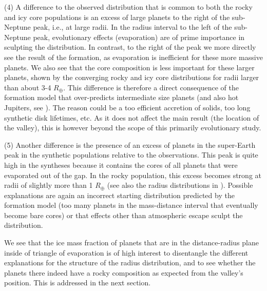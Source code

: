 \documentclass[]{emulateapj}
\def\rearth{R_{\oplus}}
\begin{document}
(4) A difference to the observed distribution that is common to both the rocky and icy core populations is an excess of large planets to the right of the sub-Neptune peak, i.e., at large radii. In the radius interval to the left of the sub-Neptune peak, evolutionary effects (evaporation) are of prime importance in sculpting the distribution. In contrast, to the right of the peak we more directly see the result of the formation, as evaporation is inefficient for these more massive planets. We also see that the core composition is less important for these larger planets, shown by the converging rocky and icy core distributions for radii larger than about 3-4 $\rearth$. This difference is therefore a direct consequence of the formation model that over-predicts intermediate size planets (and also hot Jupiters, see \citealt{Jin2014}). The reason could be a too efficient accretion of solids, too long synthetic disk lifetimes, etc. As it does not affect the main result (the location of the valley), this is however beyond the scope of this primarily evolutionary study.

(5) Another difference is the presence of an excess of planets in the super-Earth peak in the synthetic populations relative to the observations. This peak is quite high in the syntheses because it contains the cores of all planets that were evaporated out of the gap. In the rocky population, this excess becomes strong at radii of slightly more than 1 $\rearth$ (see also the radius distributions in \citealt{Jin2014}). Possible explanations are again an incorrect starting distribution predicted by the formation model (too many planets in the mass-distance interval that eventually become bare cores) or that effects other than atmospheric escape sculpt the distribution. 

We see that the ice mass fraction of planets that are in the distance-radius plane inside of triangle of evaporation is of high interest to disentangle the different explanations for the structure of the radius distribution, and to see whether the planets there indeed have a rocky composition as expected from the valley's position. This is addressed in the next section.
\end{document}
